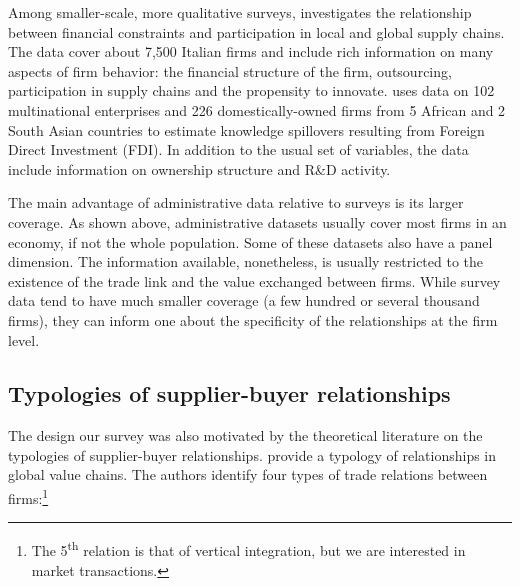 \documentclass[final, dvipsnames, authoryear,12pt]{elsarticle}
\begin{document}

Among smaller-scale, more qualitative surveys, \cite{minetti2018financial} investigates the relationship between financial constraints and participation in local and global supply chains. The data cover about 7,500 Italian firms and include rich information on many aspects of firm behavior: the financial structure of the firm, outsourcing, participation in supply chains and the propensity to innovate. \cite{newman2018linked}  uses data on 102 multinational enterprises and 226 domestically-owned firms from 5 African and 2 South Asian countries to estimate knowledge spillovers resulting from Foreign Direct Investment (FDI). In addition to the usual set of variables, the data include information on ownership structure and R\&D activity.

The main advantage of administrative data relative to surveys is its larger coverage. As shown above, administrative datasets usually cover most firms in an economy, if not the whole population. Some of these datasets also have a panel dimension. The information available, nonetheless, is usually restricted to the existence of the trade link and the value exchanged between firms. While survey data tend to have much smaller coverage (a few hundred or several thousand firms), they can inform one about the specificity of the relationships at the firm level.

\subsection{Typologies of supplier-buyer relationships}
\label{sec:typologies}

The design our survey was also motivated by the theoretical literature on the typologies of supplier-buyer relationships.  \cite{gereffi2005governance} provide a typology of relationships in global value chains. The authors identify four types of trade relations between firms:\footnote{The 5\textsuperscript{th} relation is that of vertical integration, but we are interested in market transactions.}
\end{document}
